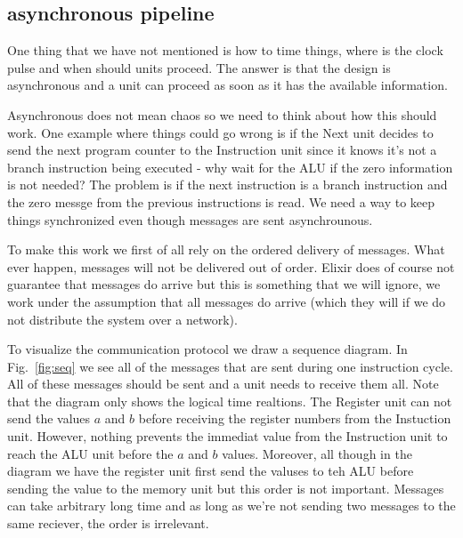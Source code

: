 \documentclass[a4paper,11pt]{article}
\begin{document}
\subsection*{asynchronous pipeline}

One thing that we have not mentioned is how to time things, where is
the clock pulse and when should units proceed. The answer is that the
design is asynchronous and a unit can proceed as soon as it has the
available information.

Asynchronous does not mean chaos so we need to think about how this
should work. One example where things could go wrong is if the Next
unit decides to send the next program counter to the Instruction unit
since it knows it's not a branch instruction being executed - why wait
for the ALU if the zero information is not needed? The problem is if
the next instruction is a branch instruction and the zero messge from
the previous instructions is read. We need a way to keep things
synchronized even though messages are sent asynchrounous. 

To make this work we first of all rely on the ordered delivery of
messages. What ever happen, messages will not be delivered out of
order. Elixir does of course not guarantee that messages do arrive but
this is something that we will ignore, we work under the assumption
that all messages do arrive (which they will if we do not distribute
the system over a network).

To visualize the communication protocol we draw a sequence diagram. In
Fig.~\ref{fig:seq} we see all of the messages that are sent during one
instruction cycle. All of these messages should be sent and a unit
needs to receive them all. Note that the diagram only shows the
logical time realtions. The Register unit can not send the values $a$
and $b$ before receiving the register numbers from the Instuction
unit. However, nothing prevents the immediat value from the
Instruction unit to reach the ALU unit before the $a$ and $b$
values. Moreover, all though in the diagram we have the register unit
first send the valuses to teh ALU before sending the value to the
memory unit but this order is not important. Messages can take
arbitrary long time and as long as we're not sending two messages to
the same reciever, the order is irrelevant. 
\end{document}
